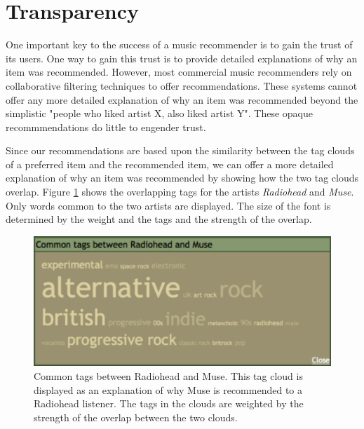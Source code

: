 \documentclass[a4paper,9pt,twocolumn]{article}
\begin{document}
\section{Transparency}
One important key to the success  of a music recommender is to gain the
trust of its users\cite{trust}.  One way to gain this trust is to provide
detailed explanations of why an item was recommended.  However,
most commercial music recommenders rely on collaborative filtering
techniques to offer recommendations.  These systems cannot offer
any more detailed explanation of why an item was recommended beyond
the simplistic "people who liked artist X, also liked artist Y".
These opaque recommmendations do little to engender trust.

Since our recommendations are based upon the similarity between  the tag clouds
of a preferred item and the recommended item, we can
offer a more detailed explanation of why an item was recommended
by showing how the two tag clouds overlap. Figure \ref{fig:commontags} shows
the overlapping tags for the artists \textit{Radiohead} and \textit{Muse}.
Only words common to the two artists are displayed. The size of the
font is determined by the weight and the tags and the strength of the
overlap.

\begin{figure}[ht]
\begin{center}
\includegraphics[width=0.9\columnwidth]{radiohead-muse-commontags}
\end{center}
\caption{Common tags between Radiohead and Muse. This tag cloud is displayed as an 
explanation of why Muse is recommended to a Radiohead listener. The tags in the 
clouds are weighted by the strength of the overlap between the two clouds.}
\label{fig:commontags}
\end{figure}

\label{section:steerable}
\end{document}
